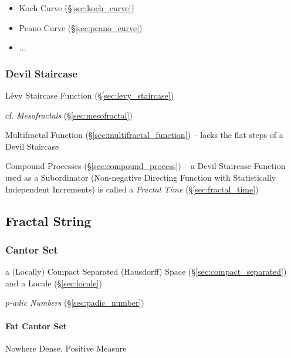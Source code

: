 \begin{itemize}
  \item Koch Curve (\S\ref{sec:koch_curve})
  \item Peano Curve (\S\ref{sec:peano_curve})
  \item ...
\end{itemize}



\subsubsection{Devil Staircase}\label{sec:devil_staircase}

L\'evy Staircase Function (\S\ref{sec:levy_staircase})

cf. \emph{Mesofractals} (\S\ref{sec:mesofractal})

\fist Multifractal Function (\S\ref{sec:multifractal_function}) -- lacks the
flat steps of a Devil Staircase

Compound Processes (\S\ref{sec:compound_process}) -- a Devil Staircase Function
used as a Subordinator (Non-negative Directing Function with Statistically
Independent Increments) is called a \emph{Fractal Time}
(\S\ref{sec:fractal_time})



\subsection{Fractal String}\label{sec:fractal_string}

\subsubsection{Cantor Set}\label{sec:cantor_set}

a (Locally) Compact Separated (Hausdorff) Space (\S\ref{sec:compact_separated})
and a Locale (\S\ref{sec:locale})

\emph{$p$-adic Numbers} (\S\ref{sec:padic_number})



\paragraph{Fat Cantor Set}\label{sec:fat_cantor_set}\hfill

Nowhere Dense, Positive Measure



